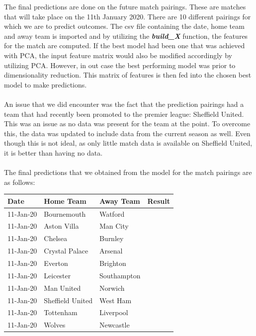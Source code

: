 \documentclass[a4paper,12pt]{article}
\begin{document}
	The final predictions are done on the future match pairings. These are matches that will take place on the 11th January 2020. There are 10 different pairings for which we are to predict outcomes. The csv file containing the date, home team and away team is imported and by utilizing the \textbf{\textit{build\_X}} function, the features for the match are computed. If the best model had been one that was achieved with PCA, the input feature matrix would also be modified accordingly by utilizing PCA. However, in out case the best performing model was prior to dimensionality reduction. This matrix of features is then fed into the chosen best model to make predictions. \\
	\\
	An issue that we did encounter was the fact that the prediction pairings had a team that had recently been promoted to the premier league: Sheffield United. This was an issue as no data was present for the team at the point. To overcome this, the data was updated to include data from the current season as well. Even though this is not ideal, as only little match data is available on Sheffield United, it is better than having no data.\\
	\\
	The final predictions that we obtained from the model for the match pairings are as follows:
	
	\begin{table}[H]
		\centering
		\begin{tabular}{@{}llll@{}}
			\toprule
			Date      & Home Team        & Away Team   & Result \\ \midrule
			11-Jan-20 & Bournemouth      & Watford     &        \\
			11-Jan-20 & Aston Villa      & Man City    &        \\
			11-Jan-20 & Chelsea          & Burnley     &        \\
			11-Jan-20 & Crystal Palace   & Arsenal     &        \\
			11-Jan-20 & Everton          & Brighton    &        \\
			11-Jan-20 & Leicester        & Southampton &        \\
			11-Jan-20 & Man United       & Norwich     &        \\
			11-Jan-20 & Sheffield United & West Ham    &        \\
			11-Jan-20 & Tottenham        & Liverpool   &        \\
			11-Jan-20 & Wolves           & Newcastle   &        \\ \bottomrule
		\end{tabular}
	\end{table}
\end{document}
